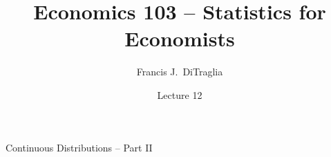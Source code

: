 \documentclass[handout]{beamer}
\title[Econ 103]{Economics 103 -- Statistics for Economists}
\author[F. DiTraglia]{Francis J.\ DiTraglia}
\institute{University of Pennsylvania}
\date{Lecture 12}
\begin{document}
 



\begin{frame}[plain]
	\titlepage 
	

\end{frame} 





\begin{frame}
\begin{center}
\Huge Continuous Distributions -- Part II
\end{center}
\end{frame}
\end{document}
